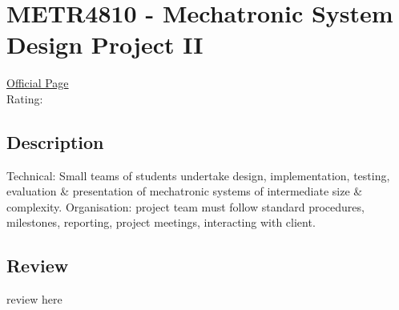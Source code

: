 \hypertarget{METR4810}{\section{METR4810 - Mechatronic System Design Project II}}

\large
\textcolor{turbo_purple}{\href{https://my.uq.edu.au/programs-courses/course.html?course_code=METR4810}{Official Page}} \\
Rating: \cstar\cstar\cstar\cstar\ostar

\normalsize
\subsection*{Description}
Technical: Small teams of students undertake design, implementation, testing, evaluation \& presentation of mechatronic systems of intermediate size \& complexity.
Organisation: project team must follow standard procedures, milestones, reporting, project meetings, interacting with client.

\subsection*{Review}
review here
